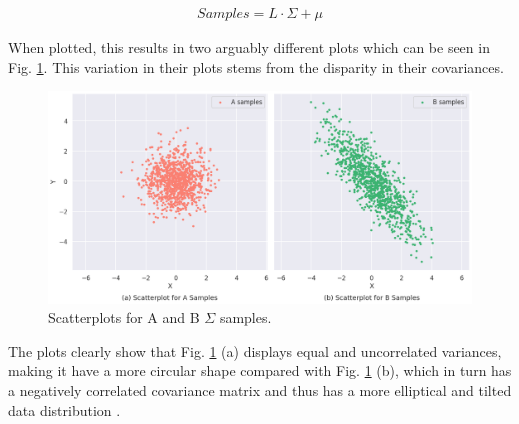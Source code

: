 \documentclass{article}
\begin{document}
\begin{gather}\label{eq:cholesky}
Samples = L\cdot\Sigma + \mu
\end{gather}

When plotted, this results in two arguably different plots which can be seen in Fig. \ref{fig:Q1A_plot}. This variation in their plots stems from the disparity in their covariances.


\begin{figure}[tb]
    \centering
    \includegraphics[width=\linewidth]{Img/Q1A.png}
    \caption{Scatterplots for A and B $\Sigma$ samples.}
    \label{fig:Q1A_plot}
\end{figure}

The plots clearly show that Fig. \ref{fig:Q1A_plot} (a) displays equal and uncorrelated variances, making it have a more circular shape compared with Fig. \ref{fig:Q1A_plot} (b), which in turn has a negatively correlated covariance matrix and thus has a more elliptical and tilted data distribution \cite{nazemi_2020}.
\end{document}
